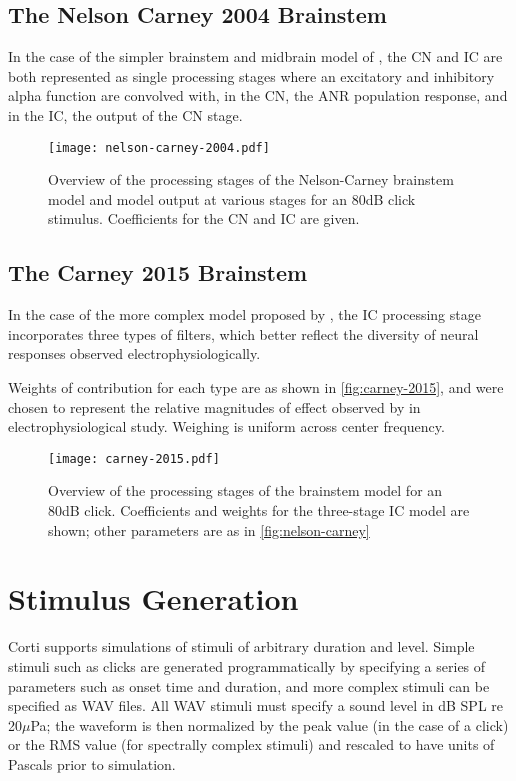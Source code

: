 \subsection{The Nelson Carney 2004 Brainstem} %
In the case of the simpler brainstem and midbrain model of \citeauthor{Nelson2004Phenomenological}, the CN and IC are both represented as single processing stages where an excitatory and inhibitory alpha function are convolved with, in the CN, the ANR population response, and in the IC, the output of the CN stage. 
\label{sub:the_nelson_carney_2004_brainstem}
\begin{figure}[htbp]
	\centering
	\texttt{[image: nelson-carney-2004.pdf]}
	\caption[Overview of the Nelson-Carney Midbrain and Brainstem]{Overview of the processing stages of the Nelson-Carney brainstem model and model output at various stages for an 80dB click stimulus. Coefficients for the CN and IC are given. }
	\label{fig:nelson-carney}
\end{figure}
\subsection{The Carney 2015 Brainstem} %
\label{sub:the_carney_2015_brainstem}
In the case of the more complex model proposed by \citeauthor{Carney2015Speech}, the IC processing stage incorporates three types of filters, which better reflect the diversity of neural responses observed electrophysiologically. 

Weights of contribution for each type are as shown in \autoref{fig:carney-2015}, and were chosen to represent the relative magnitudes of effect observed by \citeauthor{Carney2015Speech} in electrophysiological study.  Weighing is uniform across center frequency.

\begin{figure}[htbp]
	\centering
	\texttt{[image: carney-2015.pdf]}
	\caption[Overview of the Carney Midbrain and Brainstem]{Overview of the processing stages of the \citeauthor{Carney2015Speech} brainstem model for an 80dB click.  Coefficients and weights for the three-stage IC model are shown; other parameters are as in \autoref{fig:nelson-carney}}
	\label{fig:carney-2015}
\end{figure}


\section{Stimulus Generation} %
\label{sec:stimulus_generation}
Corti supports simulations of stimuli of arbitrary duration and level.  Simple stimuli such as clicks are generated programmatically by specifying a series of parameters such as onset time and duration, and more complex stimuli can be specified as WAV files.  All WAV stimuli must specify a sound level in dB SPL re 20$\mu$Pa; the waveform is then normalized by the peak value (in the case of a click) or the RMS value (for spectrally complex stimuli) and rescaled to have units of Pascals prior to simulation.
